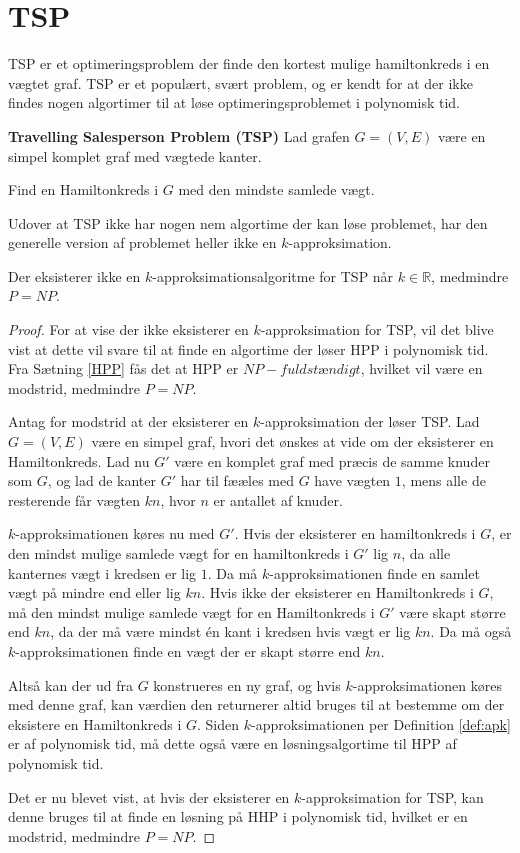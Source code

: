 \section{TSP}
TSP er et optimeringsproblem der finde den kortest mulige hamiltonkreds i en vægtet graf. TSP er et populært, svært problem, og er kendt for at der ikke findes nogen algortimer til at løse optimeringsproblemet i polynomisk tid. 

\begin{tcolorbox}
	\textbf{Travelling Salesperson Problem (TSP)} \quad Lad grafen $G=(V,E)$ være en simpel komplet graf med vægtede kanter.

	Find en Hamiltonkreds i $G$ med den mindste samlede vægt.
\end{tcolorbox}

Udover at TSP ikke har nogen nem algortime der kan løse problemet, har den generelle version af problemet heller ikke en $k$-approksimation.

\begin{thm}
	Der eksisterer ikke en $k$-approksimationsalgoritme for TSP når $k \in \mathbb{R}$, medmindre $P = NP$.
\end{thm}
\begin{proof}
	For at vise der ikke eksisterer en $k$-approksimation for TSP, vil det blive vist at dette vil svare til at finde en algortime der løser HPP i polynomisk tid.
	Fra Sætning \ref{HPP} fås det at HPP er $NP-fuldstændigt$, hvilket vil være en modstrid, medmindre $P=NP$.

	Antag for modstrid at der eksisterer en $k$-approksimation der løser TSP.
	Lad $G=(V,E)$ være en simpel graf, hvori det ønskes at vide om der eksisterer en Hamiltonkreds.
	Lad nu $G'$ være en komplet graf med præcis de samme knuder som $G$, og lad de kanter $G'$ har til fææles med $G$ have vægten $1$, mens alle de resterende får vægten $kn$, hvor $n$ er antallet af knuder.

	$k$-approksimationen køres nu med $G'$.
	Hvis der eksisterer en hamiltonkreds i $G$, er den mindst mulige samlede vægt for en hamiltonkreds i $G'$ lig $n$, da alle kanternes vægt i kredsen er lig $1$.
	Da må $k$-approksimationen finde en samlet vægt på mindre end eller lig $kn$.
	Hvis ikke der eksisterer en Hamiltonkreds i $G$, må den mindst mulige samlede vægt for en Hamiltonkreds i $G'$ være skapt større end $kn$, da der må være mindst én kant i kredsen hvis vægt er lig $kn$.
	Da må også $k$-approksimationen finde en vægt der er skapt større end $kn$.

	Altså kan der ud fra $G$ konstrueres en ny graf, og hvis $k$-approksimationen køres med denne graf, kan værdien den returnerer altid bruges til at bestemme om der eksistere en Hamiltonkreds i $G$.
	Siden $k$-approksimationen per Definition \ref{def:apk} er af polynomisk tid, må dette også være en løsningsalgortime til HPP af polynomisk tid.

	Det er nu blevet vist, at hvis der eksisterer en $k$-approksimation for TSP, kan denne bruges til at finde en løsning på HHP i polynomisk tid, hvilket er en modstrid, medmindre $P=NP$.
\end{proof}


